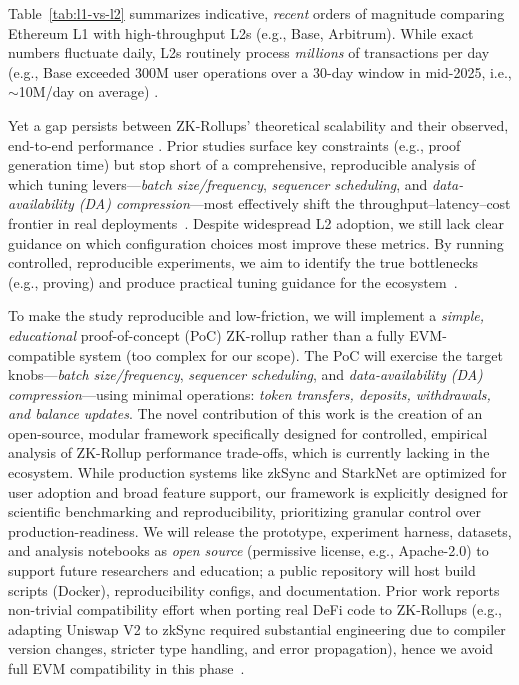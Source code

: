 Table~\ref{tab:l1-vs-l2} summarizes indicative, \emph{recent} orders of magnitude comparing Ethereum L1 with high-throughput L2s (e.g., Base, Arbitrum). While exact numbers fluctuate daily, L2s routinely process \emph{millions} of transactions per day (e.g., Base exceeded 300M user operations over a 30-day window in mid-2025, i.e., $\sim$10M/day on average) \cite{l2beat_activity}.

\vspace{12pt}



\vspace{12pt}

Yet a gap persists between ZK-Rollups’ theoretical scalability and their observed, end-to-end performance \cite{habib2025bottlenecks}. Prior studies surface key constraints (e.g., proof generation time) but stop short of a comprehensive, reproducible analysis of which tuning levers—\emph{batch size/frequency}, \emph{sequencer scheduling}, and \emph{data-availability (DA) compression}—most effectively shift the throughput–latency–cost frontier in real deployments~\cite{habib2025bottlenecks,gogol2025scalingdefi}. Despite widespread L2 adoption, we still lack clear guidance on which configuration choices most improve these metrics. By running controlled, reproducible experiments, we aim to identify the true bottlenecks (e.g., proving) and produce practical tuning guidance for the ecosystem~\cite{habib2025bottlenecks}.

\vspace{12pt}

To make the study reproducible and low-friction, we will implement a \emph{simple, educational} proof-of-concept (PoC) ZK-rollup rather than a fully EVM-compatible system (too complex for our scope). The PoC will exercise the target knobs—\emph{batch size/frequency}, \emph{sequencer scheduling}, and \emph{data-availability (DA) compression}—using minimal operations: \emph{token transfers, deposits, withdrawals, and balance updates}. The novel contribution of this work is the creation of an
open-source, modular framework specifically designed for controlled, empirical analysis of ZK-Rollup performance trade-offs, which is currently lacking in the ecosystem. While production systems like zkSync and StarkNet are optimized for user adoption and broad feature support, our framework is explicitly designed for scientific benchmarking and reproducibility, prioritizing granular control over production-readiness. We will release the prototype, experiment harness, datasets, and analysis notebooks as \emph{open source} (permissive license, e.g., Apache-2.0) to support future researchers and education; a public repository will host build scripts (Docker), reproducibility configs, and documentation. Prior work reports
non-trivial compatibility effort when porting real DeFi code to ZK-Rollups (e.g., adapting
Uniswap V2 to zkSync required substantial engineering due to compiler version changes, stricter type handling, and error propagation), hence we avoid full EVM compatibility in this phase~\cite{gogol2025scalingdefi}.

